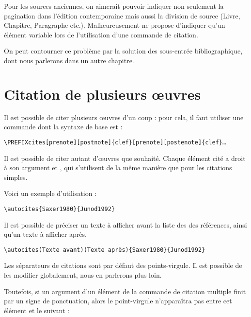 \begin{attention}
Pour les sources anciennes, on aimerait pouvoir indiquer non seulement la pagination dans l'édition contemporaine mais aussi la division de source (Livre, Chapitre, Paragraphe etc.). Malheureusement  ne propose d'indiquer qu'un élément variable lors de l'utilisation d'une commande de citation.

On peut contourner ce problème par la solution des sous-entrée bibliographique, dont nous parlerons dans un autre chapitre. 
\end{attention}

\section{Citation de plusieurs œuvres}\label{citemultiple}

Il est possible de citer plusieurs œuvres d'un coup : pour cela, il faut utiliser une commande dont la syntaxe de base est :


\begin{verbatim}
\PREFIXcites[prenote][postnote]{clef}[prenote][postenote]{clef}…
\end{verbatim}

Il est possible de citer autant d'œuvres que souhaité. Chaque élément cité a droit à son argument  et , qui s'utilisent de la même manière que pour les citations simples.


Voici un exemple d'utilisation : 

\begin{verbatim}
\autocites{Saxer1980}{Junod1992}
\end{verbatim}

\begin{quotation}
\cites{Saxer1980}{Junod1992}
\end{quotation}

Il est possible de préciser un texte à afficher avant la liste des des références, ainsi qu'un texte à afficher après.

\begin{verbatim}
\autocites(Texte avant)(Texte après){Saxer1980}{Junod1992}
\end{verbatim}

Les séparateurs de citations sont par défaut des points-virgule. Il est possible de les modifier globalement, nous en parlerons plus loin.

Toutefois, si un argument  d'un élément de la commande de citation multiple finit par un signe de ponctuation, alors le point-virgule n'apparaîtra pas entre cet élément et le suivant :

